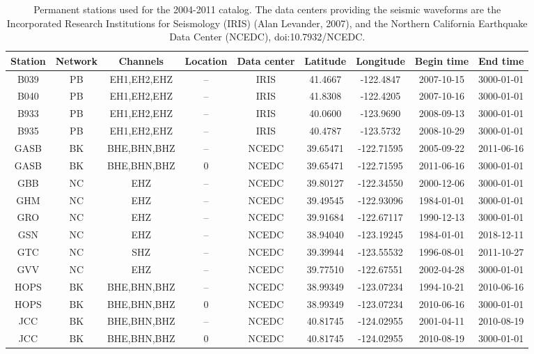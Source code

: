 \documentclass[draft]{agujournal2019}
\begin{document}
\begin{table}[hbt!]
\caption{Permanent stations used for the 2004-2011 catalog. The data centers providing the seismic waveforms are the Incorporated Research Institutions for Seismology (IRIS) (Alan Levander, 2007), and the Northern California Earthquake Data Center (NCEDC), doi:10.7932/NCEDC.}
\centering
\footnotesize
\begin{tabular}{c c c c c c c c c}
\hline
Station & Network & Channels & Location & Data center & Latitude & Longitude & Begin time & End time \\
\hline
B039 & PB & EH1,EH2,EHZ & -- & IRIS & 41.4667 &  -122.4847 & 2007-10-15 & 3000-01-01 \\
B040 & PB & EH1,EH2,EHZ & -- & IRIS & 41.8308 &  -122.4205 & 2007-10-16 & 3000-01-01 \\
B933 & PB & EH1,EH2,EHZ & -- & IRIS & 40.0600 &  -123.9690 & 2008-09-13 & 3000-01-01 \\
B935 & PB & EH1,EH2,EHZ & -- & IRIS & 40.4787 &  -123.5732 & 2008-10-29 & 3000-01-01 \\
GASB & BK & BHE,BHN,BHZ & -- & NCEDC & 39.65471 & -122.71595 & 2005-09-22 & 2011-06-16 \\
GASB & BK & BHE,BHN,BHZ & 0 & NCEDC & 39.65471 & -122.71595 & 2011-06-16 & 3000-01-01 \\
GBB & NC & EHZ & -- & NCEDC & 39.80127 & -122.34550 & 2000-12-06 & 3000-01-01 \\
GHM & NC & EHZ & -- & NCEDC & 39.49545 & -122.93096 & 1984-01-01 & 3000-01-01 \\
GRO & NC & EHZ & -- & NCEDC & 39.91684 & -122.67117 & 1990-12-13 & 3000-01-01 \\
GSN & NC & EHZ & -- & NCEDC & 38.94040 & -123.19245 & 1984-01-01 & 2018-12-11 \\
GTC & NC & SHZ & -- & NCEDC & 39.39944 & -123.55532 & 1996-08-01 & 2011-10-27 \\
GVV & NC & EHZ & -- & NCEDC & 39.77510 & -122.67551 & 2002-04-28 & 3000-01-01 \\
HOPS & BK & BHE,BHN,BHZ & -- & NCEDC & 38.99349 & -123.07234 & 1994-10-21 & 2010-06-16 \\
HOPS & BK & BHE,BHN,BHZ & 0 & NCEDC & 38.99349 & -123.07234 & 2010-06-16 & 3000-01-01 \\
JCC & BK & BHE,BHN,BHZ & -- & NCEDC & 40.81745 & -124.02955 & 2001-04-11 & 2010-08-19 \\
JCC & BK & BHE,BHN,BHZ & 0 & NCEDC & 40.81745 & -124.02955 & 2010-08-19 & 3000-01-01 \\

\end{tabular}
\end{table}
\end{document}

